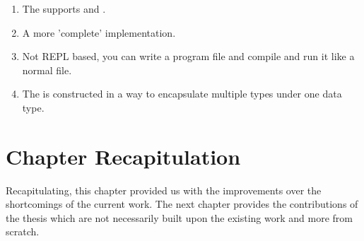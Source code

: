 \documentclass[thesis-solanki.tex]{subfiles}
\begin{document}
\begin{enumerate}
\item The  supports  and .

\item A more 'complete' implementation.

\item Not REPL based, you can write a program file and compile and run it like a normal  file.

\item The  is constructed in a way to encapsulate multiple  types under one 
data type.
\end{enumerate}

\section{Chapter Recapitulation}
Recapitulating, this chapter provided us with the improvements over the shortcomings of the current work. The next chapter
provides the contributions of the thesis which are not necessarily built upon the existing work and more from scratch.

\ifMain
\begin{scope}
  \nolinenumbers
  \enotesize
  \par
  \begin{singlespace}
  \setlength{\parskip}{12pt plus 2pt minus 1pt}
  \theendnotes
  \par
  \end{singlespace}
\end{scope}
\fi
\end{document}
